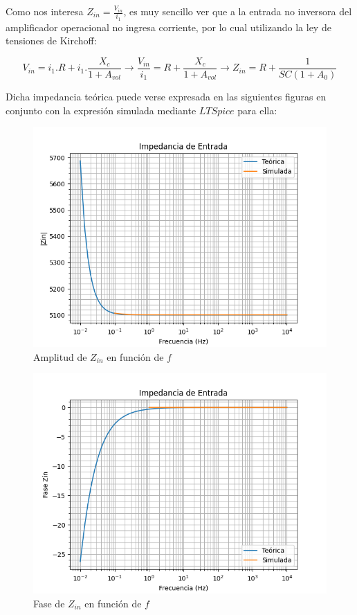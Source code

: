 Como nos interesa $Z_{in}=\frac{V_{in}}{i_1}$, es muy sencillo ver que a la entrada no inversora del amplificador operacional no ingresa corriente,
por lo cual utilizando la ley de tensiones de Kirchoff:

$$ V_{in} = i_1.R + i_1.\frac{X_c}{1+A_{vol}} \longrightarrow \frac{V_{in}}{i_1}= R + \frac{X_c}{1+A_{vol}} \longrightarrow Z_{in}=R+\frac{1}{SC(1+A_0)}$$

Dicha impedancia teórica puede verse expresada en las siguientes figuras en conjunto con la expresión simulada mediante $LTSpice$ para ella:

\begin{figure}[H]
    \centering 
    \includegraphics [scale=1] {../Ejercicio3-CircuitoIntegradoresyDerivadores/Imagenes/comparativo-integrador-zin-amplitud.png} 
    \caption{Amplitud de $Z_{in}$ en función de $f$}
    \label{fig:emptyPlotTool}
\end{figure}

\begin{figure}[H]
    \centering 
    \includegraphics [scale=1] {../Ejercicio3-CircuitoIntegradoresyDerivadores/Imagenes/comparativo-integrador-zin-fase.png} 
    \caption{Fase de $Z_{in}$ en función de $f$ }
    \label{fig:emptyPlotTool}
\end{figure}

